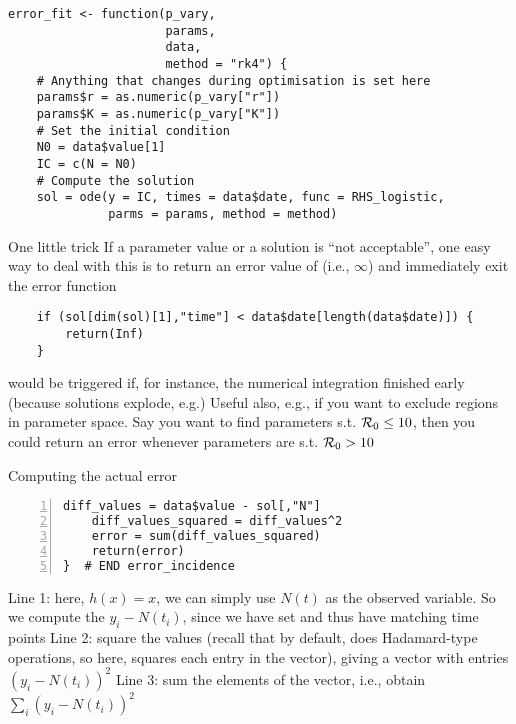 \documentclass[aspectratio=169]{beamer}
\begin{document}
\begin{frame}[fragile]
\begin{lstlisting}
error_fit <- function(p_vary, 
                      params, 
                      data,
                      method = "rk4") {
    # Anything that changes during optimisation is set here
    params$r = as.numeric(p_vary["r"])
    params$K = as.numeric(p_vary["K"])
    # Set the initial condition
    N0 = data$value[1]
    IC = c(N = N0)
    # Compute the solution
    sol = ode(y = IC, times = data$date, func = RHS_logistic, 
              parms = params, method = method)
\end{lstlisting}
\end{frame}

\begin{frame}[fragile]{One little trick}
    If a parameter value or a solution is ``not acceptable'', one easy way to deal with this is to return an error value of  (i.e., $\infty$) and immediately exit the error function
    \vfill
\begin{lstlisting}
    if (sol[dim(sol)[1],"time"] < data$date[length(data$date)]) {
        return(Inf)
    }    
\end{lstlisting}
would be triggered if, for instance, the numerical integration finished early (because solutions explode, e.g.)
\vfill
Useful also, e.g., if you want to exclude regions in parameter space. Say you want to find parameters s.t. $\mathcal{R}_0\leq 10$, then you could return an  error whenever parameters are s.t. $\mathcal{R}_0>10$
\end{frame}


\begin{frame}[fragile]{Computing the actual error}
\begin{lstlisting}[numbers=left]
    diff_values = data$value - sol[,"N"]
    diff_values_squared = diff_values^2
    error = sum(diff_values_squared)
    return(error)
}  # END error_incidence
\end{lstlisting}
\vfill
Line 1: here, $h(x)=x$, we can simply use $N(t)$ as the observed variable. So we compute the $y_i-N(t_i)$, since we have set  and thus have matching time points
\vfill
Line 2: square the values (recall that by default,  does Hadamard-type operations, so here, squares each entry in the vector), giving a vector with entries $(y_i-N(t_i))^2$
\vfill
Line 3: sum the elements of the vector, i.e., obtain $\sum_{i}(y_i-N(t_i))^2$
\end{frame}
\end{document}

